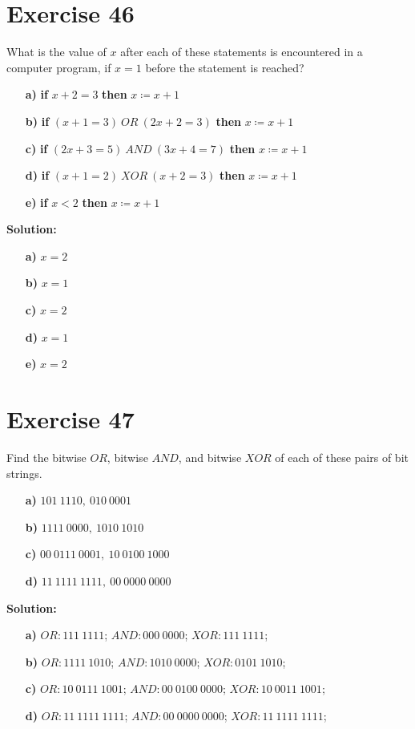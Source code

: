 \documentclass{Axon}
\begin{document}
\section*{Exercise 46}
What is the value of \(x\) after each of these statements is encountered in a computer program, if \(x = 1\) before the statement is reached?
\begin{enumerate}
    \item[\textbf{a)}] \textbf{if} \(x + 2 = 3\) \textbf{then} \(x \coloneq x + 1\)
    \item[\textbf{b)}] \textbf{if} \((x + 1 = 3) \ OR \ (2x + 2 = 3)\) \textbf{then} \(x \coloneq x + 1\)
    \item[\textbf{c)}] \textbf{if} \((2x + 3 = 5) \ AND \ (3x + 4 = 7)\) \textbf{then} \(x \coloneq x + 1\)
    \item[\textbf{d)}] \textbf{if} \((x + 1 = 2) \ XOR \ (x + 2 = 3)\) \textbf{then} \(x \coloneq x + 1\)
    \item[\textbf{e)}] \textbf{if} \(x < 2\) \textbf{then} \(x \coloneq x + 1\)
\end{enumerate}

\noindent
\textbf{Solution:}
\begin{enumerate}
    \item[\textbf{a)}] \(x = 2\)
    \item[\textbf{b)}] \(x = 1\)
    \item[\textbf{c)}] \(x = 2\)
    \item[\textbf{d)}] \(x = 1\)
    \item[\textbf{e)}] \(x = 2\)
\end{enumerate}

\section*{Exercise 47}
Find the bitwise \(OR\), bitwise \(AND\), and bitwise \(XOR\) of each of these pairs of bit strings.
\begin{enumerate}
    \item[\textbf{a)}] \(101 \ 1110, \ 010 \ 0001\)
    \item[\textbf{b)}] \(1111 \ 0000, \ 1010 \ 1010\)
    \item[\textbf{c)}] \(00 \ 0111 \ 0001, \ 10 \ 0100 \ 1000\)
    \item[\textbf{d)}] \(11 \ 1111 \ 1111, \ 00 \ 0000 \ 0000\)
\end{enumerate}

\noindent
\textbf{Solution:}
\begin{enumerate}
    \item[\textbf{a)}] \(OR: 111 \ 1111\); \(AND: 000 \ 0000\); \(XOR: 111 \ 1111\);
    \item[\textbf{b)}] \(OR: 1111 \ 1010\); \(AND: 1010 \ 0000\); \(XOR: 0101 \ 1010\);
    \item[\textbf{c)}] \(OR: 10 \ 0111 \ 1001\); \(AND: 00 \ 0100 \ 0000\); \(XOR: 10 \ 0011 \  1001\);
    \item[\textbf{d)}] \(OR: 11 \ 1111 \ 1111\); \(AND: 00 \ 0000 \ 0000\); \(XOR: 11 \ 1111 \ 1111\);
\end{enumerate}
\end{document}
